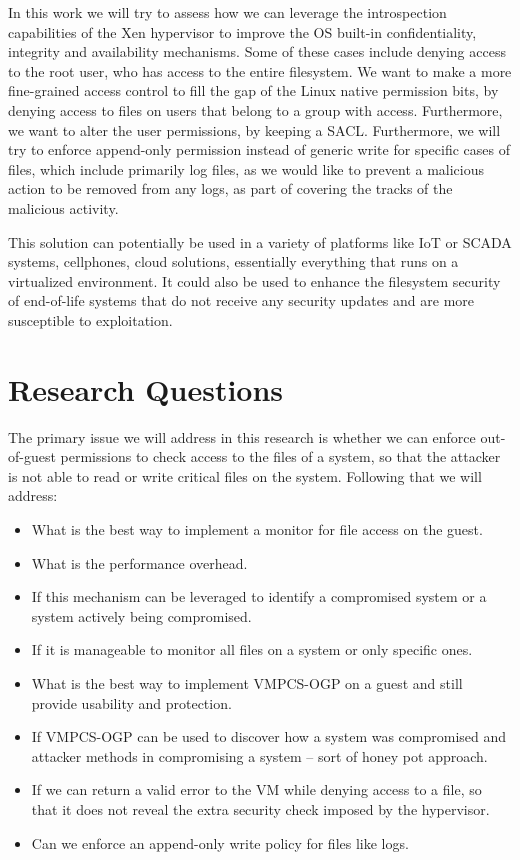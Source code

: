 \par In this work we will try to assess how we can leverage the introspection capabilities of the Xen hypervisor to improve the \ac{OS} built-in confidentiality, integrity and availability mechanisms. Some of these cases include denying access to the root user, who has access to the entire filesystem. We want to make a more fine-grained access control to fill the gap of the Linux native permission bits, by denying access to files on users that belong to a group with access. Furthermore, we want to alter the user permissions, by keeping a \ac{SACL}. Furthermore, we will try to enforce append-only permission instead of generic write for specific cases of files, which include primarily log files, as we would like to prevent a malicious action to be removed from any logs, as part of covering the tracks of the malicious activity. 

\par This solution can potentially be used in a variety of platforms like \ac{IoT} or \ac{SCADA} systems, cellphones, cloud solutions, essentially everything that runs on a virtualized environment. It could also be used to enhance the filesystem security of end-of-life systems that do not receive any security updates and are more susceptible to exploitation.

\section{Research Questions}\label{sec:question}
\par The primary issue we will address in this research is whether we can enforce out-of-guest permissions to check access to the files of a system, so that the attacker is not able to read or write critical files on the system. Following that we will address:
\begin{itemize}
	\item What is the best way to implement a monitor for file access on the guest.
	\item What is the performance overhead.
	\item If this mechanism can be leveraged to identify a compromised system or a system actively being compromised.
	\item If it is manageable to monitor all files on a system or only specific ones. 
	\item What is the best way to implement \ac{VMPCS-OGP} on a guest and still provide usability and protection.
	\item If \ac{VMPCS-OGP} can be used to discover how a system was compromised and attacker methods in compromising a system – sort of honey pot approach.
	\item If we can return a valid error to the VM while denying access to a file, so that it does not reveal the extra security check imposed by the hypervisor.
	\item Can we enforce an append-only write policy for files like logs.
\end{itemize}

